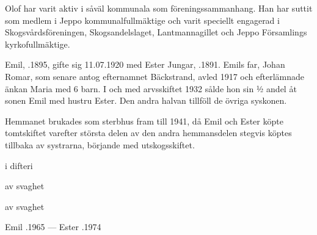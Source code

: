 Olof har varit aktiv i såväl kommunala som föreningssammanhang. Han har suttit som medlem i Jeppo kommunalfullmäktige och varit speciellt engagerad i Skogsvårdsföreningen, Skogsandelslaget, Lantmannagillet och Jeppo Församlings kyrkofullmäktige.


%



%
Emil, .1895, gifte sig 11.07.1920 med Ester Jungar, .1891. Emils far, Johan Romar, som senare antog efternamnet Bäckstrand, avled 1917 och efterlämnade änkan Maria med 6 barn. I och med arvsskiftet 1932 sålde hon sin ½ andel åt sonen Emil  med hustru Ester. Den andra halvan tillföll de övriga syskonen.

Hemmanet brukades som sterbhus fram till 1941, då Emil och Ester köpte tomtskiftet varefter största delen av den andra hemmansdelen stegvis köptes tillbaka av systrarna, börjande med utskogsskiftet.
\begin{jhchildren}
  \item {}
  \item {} i difteri
  \item {}
  \item {}
  \item {} av svaghet
  \item {} av svaghet
\end{jhchildren}

Emil .1965  ---  Ester .1974


